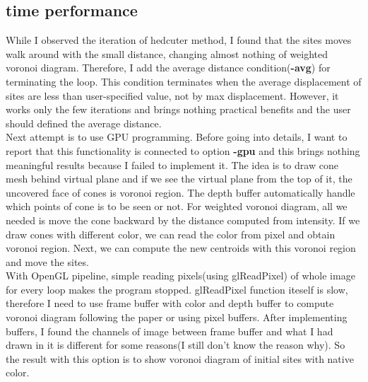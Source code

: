 \documentclass[11pt]{article}
\begin{document}
\subsection{time performance}
While I observed the iteration of hedcuter method, I found that the sites moves walk around with the small distance, changing almost nothing of weighted voronoi diagram. Therefore, I add the average distance condition(\textbf{-avg}) for terminating the loop. This condition terminates when the average displacement of sites are less than user-specified value, not by max displacement. However, it works only the few iterations and brings nothing practical benefits and the user should defined the average distance.\\
Next attempt is to use GPU programming\cite{Hoff:1999:FCG:311535.311567}. Before going into details, I want to report that this functionality is connected to option \textbf{-gpu} and this brings nothing meaningful results because I failed to implement it. The idea is to draw cone mesh behind virtual plane and if we see the virtual plane from the top of it, the uncovered face of cones is voronoi region. The depth buffer automatically handle which points of cone is to be seen or not. For weighted voronoi diagram, all we needed is move the cone backward by the distance computed from intensity. If we draw cones with different color, we can read the color from pixel and obtain voronoi region. Next, we can compute the new centroids with this voronoi region and move the sites.\\
With OpenGL pipeline, simple reading pixels(using glReadPixel) of whole image for every loop makes the program stopped. glReadPixel function iteself is slow, therefore I need to use frame buffer with color and depth buffer to compute voronoi diagram following the paper\cite{Hoff:1999:FCG:311535.311567} or using pixel buffers. After implementing buffers, I found the channels of image between frame buffer and what I had drawn in it is different for some reasons(I still don't know the reason why). So the result with this option is to show voronoi diagram of initial sites with native color.
\end{document}
